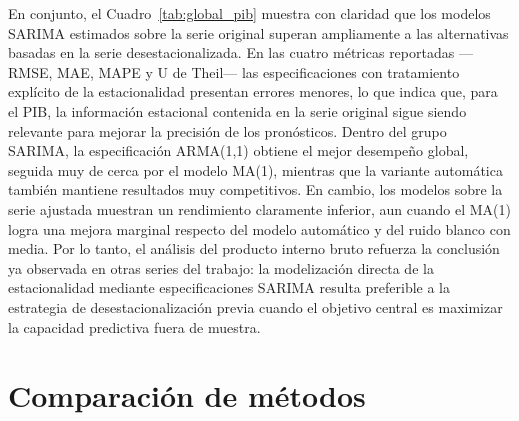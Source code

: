 \documentclass[11pt]{article}
\begin{document}
En conjunto, el Cuadro~\ref{tab:global_pib} muestra con claridad que los modelos SARIMA estimados sobre la serie original superan ampliamente a las alternativas basadas en la serie desestacionalizada. En las cuatro métricas reportadas ---RMSE, MAE, MAPE y U de Theil--- las especificaciones con tratamiento explícito de la estacionalidad presentan errores menores, lo que indica que, para el PIB, la información estacional contenida en la serie original sigue siendo relevante para mejorar la precisión de los pronósticos. Dentro del grupo SARIMA, la especificación ARMA(1,1) obtiene el mejor desempeño global, seguida muy de cerca por el modelo MA(1), mientras que la variante automática también mantiene resultados muy competitivos. En cambio, los modelos sobre la serie ajustada muestran un rendimiento claramente inferior, aun cuando el MA(1) logra una mejora marginal respecto del modelo automático y del ruido blanco con media. Por lo tanto, el análisis del producto interno bruto refuerza la conclusión ya observada en otras series del trabajo: la modelización directa de la estacionalidad mediante especificaciones SARIMA resulta preferible a la estrategia de desestacionalización previa cuando el objetivo central es maximizar la capacidad predictiva fuera de muestra.

\begin{table}[H]
\centering
\caption{Comparación global de modelos de pronóstico – DL\_PIB}
\label{tab:global_pib}
\end{table}

\section{Comparación de métodos}
\end{document}
